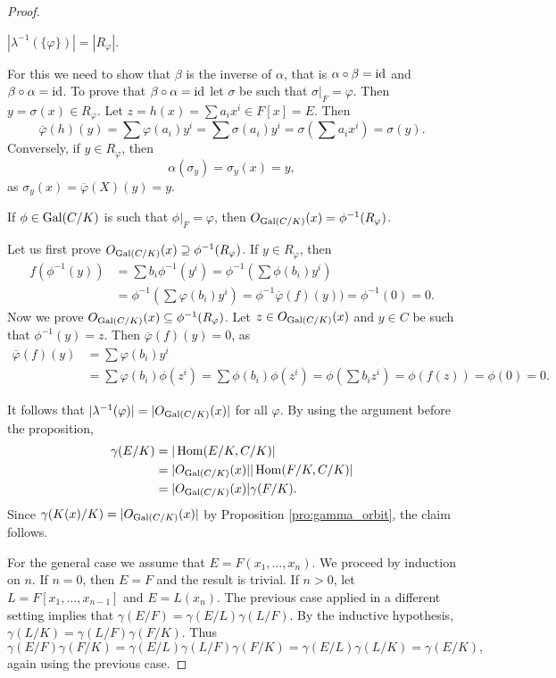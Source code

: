 \begin{proof}
    \begin{claim}
        $|\lambda^{-1}(\{\varphi\})|=|R_\varphi|$. 
    \end{claim}
    
    For this we need to show that $\beta$ is
    the inverse of $\alpha$, that is 
    $\alpha\circ\beta=\operatorname{id}$ and $\beta\circ\alpha=\operatorname{id}$. 
    To prove that $\beta\circ\alpha=\operatorname{id}$ 
    let $\sigma$ be such that $\sigma|_F=\varphi$. 
    Then $y=\sigma(x)\in R_\varphi$. Let
    $z=h(x)=\sum a_ix^i\in F[x]=E$. Then  
    \[
    \overline{\varphi}(h)(y)=\sum\varphi(a_i)y^i=\sum\sigma(a_i)y^i
    =\sigma\left(\sum a_ix^i\right)=\sigma(y).
    \]
    Conversely, if $y\in R_\varphi$, then
    \[
    \alpha(\sigma_y)=\sigma_y(x)=y,
    \]
    as $\sigma_y(x)=\overline{\varphi}(X)(y)=y$.
    
    \begin{claim}
        If $\phi\in\operatorname{Gal}(C/K)$ is such that $\phi|_F=\varphi$, then 
        $O_{\operatorname{Gal}(C/K)}(x)=\phi^{-1}(R_\varphi)$.
    \end{claim}

    Let us first prove $O_{\operatorname{Gal}(C/K)}(x)\supseteq \phi^{-1}(R_\varphi)$.
    If $y\in R_{\varphi}$, 
    then 
    \begin{align*}
    f(\phi^{-1}(y))&=\sum b_i\phi^{-1}(y^i)=\phi^{-1}\left(\sum\phi(b_i)y^i\right)\\
    &=\phi^{-1}\left(\sum\varphi(b_i)y^i\right)=\phi^{-1}\overline{\varphi}(f)(y))=\phi^{-1}(0)=0.
    \end{align*}
    Now we prove $O_{\operatorname{Gal}(C/K)}(x)\subseteq\phi^{-1}(R_\varphi)$.
    Let $z\in O_{\operatorname{Gal}(C/K)}(x)$ and $y\in C$ be such that 
    $\phi^{-1}(y)=z$. Then $\overline{\varphi}(f)(y)=0$, as
    \begin{align*}
    \overline{\varphi}(f)(y)&=\sum\varphi(b_i)y^i\\
    &=\sum\varphi(b_i)\phi(z^i)
    =\sum\phi(b_i)\phi(z^i)=\phi\left(\sum b_iz^i\right)=\phi(f(z))=\phi(0)=0.
    \end{align*}
    
    \medskip
    It follows that $|\lambda^{-1}(\varphi)|=|O_{\operatorname{Gal}(C/K)}(x)|$ for
    all $\varphi$. By using the argument
    before the proposition, 
    \begin{align*}
    \gamma(E/K)&=|\operatorname{Hom}(E/K,C/K)|\\
        &=|O_{\operatorname{Gal}(C/K)}(x)||\operatorname{Hom}(F/K,C/K)|\\
        &=|O_{\operatorname{Gal}(C/K)}(x)|\gamma(F/K).
    \end{align*}
    Since $\gamma(K(x)/K)=|O_{\operatorname{Gal}(C/K)}(x)|$ by Proposition \ref{pro:gamma_orbit}, the claim follows. 
    
    \medskip 
    For the general case we assume that $E=F(x_1,\dots,x_n)$. We proceed
    by induction on $n$. If $n=0$, then $E=F$ and the result is trivial. 
    If $n>0$, let $L=F[x_1,\dots,x_{n-1}]$ and $E=L(x_n)$. The previous
    case applied in a different setting 
    implies that $\gamma(E/F)=\gamma(E/L)\gamma(L/F)$. By the inductive 
    hypothesis, $\gamma(L/K)=\gamma(L/F)\gamma(F/K)$. Thus 
    \[
    \gamma(E/F)\gamma(F/K)=\gamma(E/L)\gamma(L/F)\gamma(F/K)
    =\gamma(E/L)\gamma(L/K)=\gamma(E/K),
    \]
    again using the previous case. 
\end{proof}

